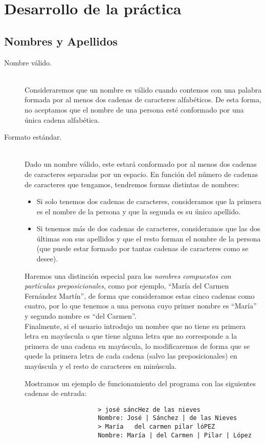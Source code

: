 \documentclass[12pt]{article}
\begin{document}
    \section{Desarrollo de la práctica}
    \subsection{Nombres y Apellidos}
    \begin{description}
        \item [Nombre válido.]~\\
            Consideraremos que un nombre es válido cuando contemos con una palabra formada por al menos dos cadenas de caracteres alfabéticos. De esta forma, no aceptamos que el nombre de una persona esté conformado por una única cadena alfabética.
        \item [Formato estándar.]~\\
            Dado un nombre válido, este estará conformado por al menos dos cadenas de caracteres separadas por un espacio. En función del número de cadenas de caracteres que tengamos, tendremos formas distintas de nombres:
            \begin{itemize}
                \item Si solo tenemos dos cadenas de caracteres, consideramos que la primera es el nombre de la persona y que la segunda es su único apellido.
                \item Si tenemos más de dos cadenas de caracteres, consideramos que las dos últimas son sus apellidos y que el resto forman el nombre de la persona (que puede estar formado por tantas cadenas de caracteres como se desee).
            \end{itemize}
            Haremos una distinción especial para los \textit{nombres compuestos con partículas preposicionales}, como por ejemplo, ``María del Carmen Fernández Martín'', de forma que consideramos estas cinco cadenas como cuatro, por lo que tenemos a una persona cuyo primer nombre es ``María'' y segundo nombre es ``del Carmen''.\\

            Finalmente, si el usuario introdujo un nombre que no tiene su primera letra en mayúscula o que tiene alguna letra que no corresponde a la primera de una cadena en mayúscula, lo modificaremos de forma que se quede la primera letra de cada cadena (salvo las preposicionales) en mayúscula y el resto de caracteres en minúscula.

            \begin{ejemplo}
                Mostramos un ejemplo de funcionamiento del programa con las siguientes cadenas de entrada:
                \begin{verbatim}
                    > josé sáncHez de las nieves
                    Nombre: José | Sánchez | de las Nieves
                    > María   del carmen pilar lóPEZ
                    Nombre: María | del Carmen | Pilar | López
                \end{verbatim}
            \end{ejemplo}
    \end{description}
\end{document}
